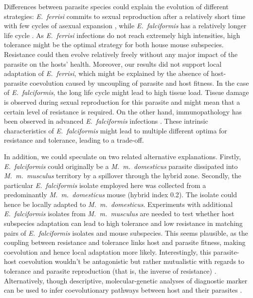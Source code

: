 \documentclass[12pt]{article}
\begin{document}
Differences between parasite species could explain the evolution of different strategies: \textit{E.~ferrisi} commits to sexual reproduction after a relatively short time with few cycles of asexual expansion \citep{al-khlifeh_eimeria_2019, ankrom_life_1975}, while \textit{E.~falciformis} has a relatively longer life cycle \citep{al-khlifeh_eimeria_2019, haberkorn_entwicklung_1970}. As \textit{E.~ferrisi }infections do not reach extremely high intensities, high tolerance might be the optimal strategy for both house mouse subspecies. Resistance could then evolve relatively freely without any major impact of the parasite on the hosts’ health. Moreover, our results did not support local adaptation of \textit{E.~ferrisi}, which might be explained by the absence of host-parasite coevolution caused by uncoupling of parasite and host fitness. In the case of \textit{E.~falciformis}, the long life cycle might lead to high tissue load. Tissue damage is observed during sexual reproduction for this parasite \citep{ehret_dual_2017} and might mean that a certain level of resistance is required. On the other hand, immunopathology has been observed in advanced \textit{E.~falciformis} infections \citep{stange_il-22_2012}. These intrinsic characteristics of \textit{E.~falciformis} might lead to multiple different optima for resistance and tolerance, leading to a trade-off.\par

In addition, we could speculate on two related alternative explanations. Firstly, \textit{E.~falciformis} could originally be a \textit{M.~m.~domesticus} parasite dissipated into \textit{M.~m.~musculus} territory by a spillover through the hybrid zone. Secondly, the particular \textit{E.~falciformis} isolate employed here was collected from a predominantly \textit{M.~m.~domesticus} mouse (hybrid index 0.2). The isolate could hence be locally adapted to \textit{M.~m.~domesticus}. Experiments with additional \textit{E.~falciformis} isolates from \textit{M.~m.~musculus} are needed to test whether host subspecies adaptation can lead to high tolerance and low resistance in matching pairs of \textit{E.~falciformis} isolates and mouse subspecies. This seems plausible, as the coupling between resistance and tolerance links host and parasite fitness, making coevolution and hence local adaptation more likely. Interestingly, this parasite-host coevolution wouldn’t be antagonistic but rather mutualistic with regards to tolerance and parasite reproduction (that is, the inverse of resistance) \citep{little_coevolution_2010, raaberg_decomposing_2009}. Alternatively, though descriptive, molecular-genetic analyses of diagnostic marker can be used to infer coevolutionary pathways between host and their parasites \parencite[e.g. ][]{kvac_coevolution_2013,gouy_de_bellocq_holobiont_2018}.
\par
\end{document}
